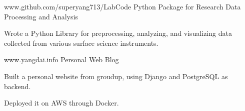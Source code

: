 


\begin{cventries}


\cventry
{www.github.com/superyang713/LabCode}
{Python Package for Research Data Processing and Analysis}
{}
{}
{ %
\begin{cvitems}
\item {Wrote a Python Library for preprocessing, analyzing, and visualizing data
    collected from various surface science instruments.}
\end{cvitems}
}


\cventry
{www.yangdai.info}
{Personal Web Blog}
{}
{}
{ %
\begin{cvitems}
\item {Built a personal website from groudup, using Django and PostgreSQL as
    backend.}
\item {Deployed it on AWS through Docker.}
\end{cvitems}
}


\end{cventries}


